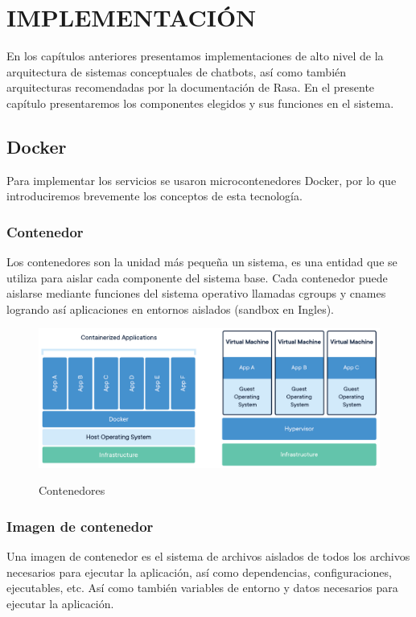 \chapter[IMPLEMENTACIÓN]{IMPLEMENTACIÓN}
En los capítulos anteriores presentamos implementaciones de alto nivel de la arquitectura de
sistemas conceptuales de chatbots, así como también arquitecturas recomendadas por la documentación
de Rasa. En el presente capítulo presentaremos los componentes elegidos y sus funciones en el
sistema.

\section{Docker}

Para implementar los servicios se usaron microcontenedores Docker, por lo que introduciremos
brevemente los conceptos de esta tecnología.

\subsection{Contenedor}

Los contenedores son la unidad más pequeña un sistema, es una entidad que se utiliza para aislar
cada componente del sistema base. Cada contenedor puede aislarse mediante funciones del sistema
operativo llamadas cgroups y cnames logrando así aplicaciones en entornos aislados (sandbox en
Ingles). \cite{Docker}

\begin{figure}[ht]
	\centering
	\includegraphics[width=\textwidth]{imagenes/cap4/docker-container.png}
	\caption{Contenedores}
  \cite{Docker}
	\label{fig:container_diagram}
\end{figure}

\subsection{Imagen de contenedor}

Una imagen de contenedor es el sistema de archivos aislados de todos los archivos necesarios para
ejecutar la aplicación, así como dependencias, configuraciones, ejecutables, etc. Así como también
variables de entorno y datos necesarios para ejecutar la aplicación. \cite{Docker}

